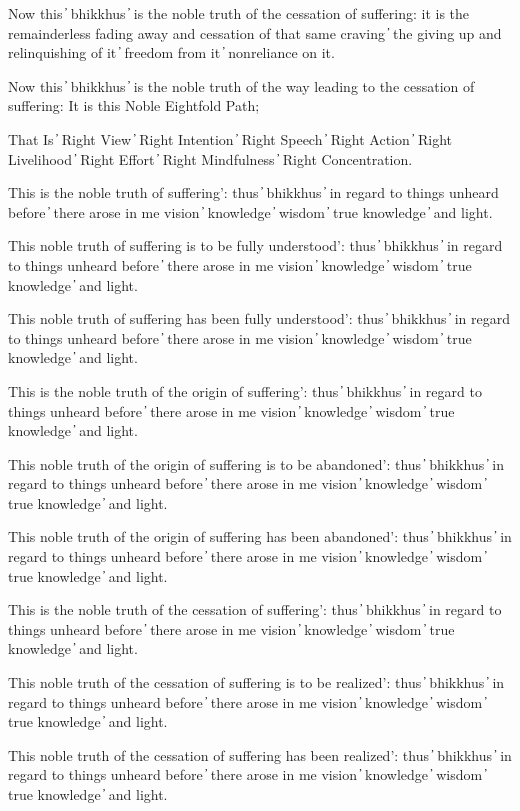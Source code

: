 Now this  ̓  bhikkhus  ̓  is the noble truth of the cessation of suffering: it is the remainderless fading away and cessation of that same craving  ̓  the giving up and relinquishing of it  ̓  freedom from it  ̓  nonreliance on it.

Now this  ̓  bhikkhus  ̓  is the noble truth of the way leading to the cessation of suffering: It is this Noble Eightfold Path;

That Is  ̓  Right View  ̓  Right Intention  ̓  Right Speech  ̓  Right Action  ̓  Right Livelihood  ̓  Right Effort  ̓  Right Mindfulness  ̓  Right Concentration.

This is the noble truth of suffering’: thus  ̓  bhikkhus  ̓  in regard to things unheard before  ̓  there arose in me vision  ̓  knowledge  ̓  wisdom  ̓  true knowledge  ̓  and light.

This noble truth of suffering is to be fully understood’: thus  ̓  bhikkhus  ̓  in regard to things unheard before  ̓  there arose in me vision  ̓  knowledge  ̓  wisdom  ̓  true knowledge  ̓  and light.

This noble truth of suffering has been fully understood’: thus  ̓  bhikkhus  ̓  in regard to things unheard before  ̓  there arose in me vision  ̓  knowledge  ̓  wisdom  ̓  true knowledge  ̓  and light.

This is the noble truth of the origin of suffering’: thus  ̓  bhikkhus  ̓  in regard to things unheard before  ̓  there arose in me vision  ̓  knowledge  ̓  wisdom  ̓  true knowledge  ̓  and light.

This noble truth of the origin of suffering is to be abandoned’: thus  ̓  bhikkhus  ̓  in regard to things unheard before  ̓  there arose in me vision  ̓  knowledge  ̓  wisdom  ̓  true knowledge  ̓  and light.

This noble truth of the origin of suffering has been abandoned’: thus  ̓  bhikkhus  ̓  in regard to things unheard before  ̓  there arose in me vision  ̓  knowledge  ̓  wisdom  ̓  true knowledge  ̓  and light.

This is the noble truth of the cessation of suffering’: thus  ̓  bhikkhus  ̓  in regard to things unheard before  ̓  there arose in me vision  ̓  knowledge  ̓  wisdom  ̓  true knowledge  ̓  and light.

This noble truth of the cessation of suffering is to be realized’: thus  ̓  bhikkhus  ̓  in regard to things unheard before  ̓  there arose in me vision  ̓  knowledge  ̓  wisdom  ̓  true knowledge  ̓  and light.

This noble truth of the cessation of suffering has been realized’: thus  ̓  bhikkhus  ̓  in regard to things unheard before  ̓  there arose in me vision  ̓  knowledge  ̓  wisdom  ̓  true knowledge  ̓  and light.


